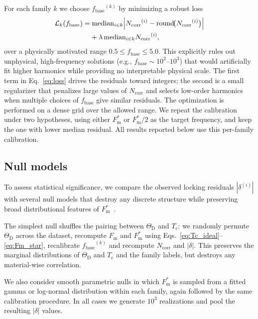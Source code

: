 \documentclass[aps,prb,twocolumn,superscriptaddress,floatfix,nofootinbib]{revtex4-2}
\newcommand{\Tc}{\ensuremath{T_{\mathrm{c}}}}
\newcommand{\ThetaD}{\ensuremath{\Theta_{\mathrm{D}}}}
\newcommand{\Fm}{\ensuremath{F_{\mathrm{m}}}}
\newcommand{\Fmstar}{\ensuremath{{F_{\mathrm{m}}^{\ast}}}}
\newcommand{\fbase}{\ensuremath{{f_{\mathrm{base}}}}}
\newcommand{\Ncorr}{\ensuremath{{N_{\mathrm{corr}}}}}
\newcommand{\deltalock}{\ensuremath{\delta}}
\begin{document}
For each family $k$ we choose $\fbase^{(k)}$ by minimizing
a robust loss
\begin{equation}
  \label{eq:loss}
  \begin{split}
    \mathcal{L}_k(\fbase) = & \;\mathrm{median}_{i \in k}
    \Bigl|\Ncorr^{(i)} - \mathrm{round}\!\bigl(\Ncorr^{(i)}\bigr)\Bigr| \\
    & + \lambda \,\mathrm{median}_{i \in k} \Ncorr^{(i)},
  \end{split}
\end{equation}
over a physically motivated range
$0.5 \le \fbase \le 5.0$.
This explicitly rules out unphysical, high-frequency solutions
(e.g., $\fbase \sim 10^2$--$10^3$) that would artificially fit
higher harmonics while providing no interpretable physical scale.
The first term in Eq.~\eqref{eq:loss} drives the residuals toward integers;
the second is a small regularizer that penalizes large values of
$\Ncorr$ and selects low-order harmonics when multiple choices of
$\fbase$ give similar residuals.
The optimization is performed on a dense grid over the allowed range.
We repeat the calibration under two hypotheses,
using either $\Fmstar$ or $\Fmstar/2$ as the target frequency,
and keep the one with lower median residual.
All results reported below use this per-family calibration.

\subsection{Null models}

To assess statistical significance, we compare the observed
locking residuals $|\deltalock^{(i)}|$ with several null models
that destroy any discrete structure while preserving
broad distributional features of $\Fmstar$~\cite{Efron1993}.

The simplest null shuffles the pairing between $\ThetaD$ and $\Tc$:
we randomly permute $\ThetaD$ across the dataset, recompute
$\Fm$ and $\Fmstar$ using Eqs.~\eqref{eq:Tc_ideal}--\eqref{eq:Fm_star},
recalibrate $\fbase^{(k)}$ and recompute $\Ncorr$ and $|\deltalock|$.
This preserves the marginal distributions of $\ThetaD$ and $\Tc$
and the family labels, but destroys any material-wise correlation.

We also consider smooth parametric nulls in which $\Fmstar$
is sampled from a fitted gamma or log-normal distribution within
each family, again followed by the same calibration procedure.
In all cases we generate $10^3$ realizations and pool the resulting
$|\deltalock|$ values.
\end{document}
